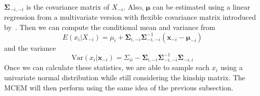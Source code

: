 \documentclass[preprint,12pt]{elsarticle}
\begin{document}
$\boldsymbol{\Sigma}_{-i,-i}$ is the covariance matrix of $X_{-i}$. 
Also, $\boldsymbol{\mu}$ can be estimated using a linear regression from a multivariate version with flexible covariance matrix introduced by~\citet{ziyatdinov2018lme4qtl}.
Then we can compute the conditional mean and variance from 
\begin{equation} 
    E(x_i|X_{-i})=\mu_i + \boldsymbol{\Sigma}_{i,-i}\boldsymbol{\Sigma}_{-i,-i}^{-1} (\mathbf{x}_{-i} - \boldsymbol{\mu}_{-i})
\end{equation}
and the variance 
\begin{equation} 
    \text{Var}(x_i|\mathbf{x}_{-i})=\Sigma_{ii} - \boldsymbol{\Sigma}_{i,-i}\boldsymbol{\Sigma}_{-i,-i}^{-1}\boldsymbol{\Sigma}_{-i,i}
\end{equation}
Once we can calculate these statistics, we are able to sample each $x_i$ using a univariate normal distribution while still considering the kinship matrix. 
The MCEM will then perform using the same idea of the previous subsection. 
\end{document}

